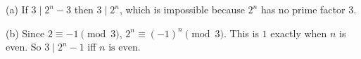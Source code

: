 (a) If $3\mid2^n-3$ then $3\mid2^n$, which is impossible because $2^n$ has no prime factor $3$.

(b) Since $2\equiv-1\pmod3$, $2^n\equiv(-1)^n\pmod 3$. This is $1$ exactly when $n$ is even. So $3\mid2^n-1$ iff $\boxed{n\text{ is even}}$.
